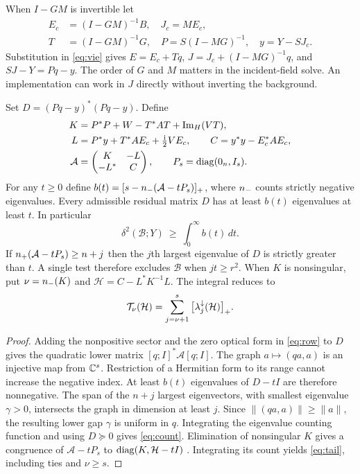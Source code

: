 When $I-GM$ is invertible let
\begin{align}
 E_c&=(I-GM)^{-1}B,\quad J_c=ME_c,\nonumber\\
 T&=(I-GM)^{-1}G,\quad P=S(I-MG)^{-1},\quad y=Y-SJ_c .
 \label{eq:shift}
\end{align}
Substitution in \eqref{eq:vie} gives $E=E_c+Tq$, $J=J_c+(I-MG)^{-1}q$, and $SJ-Y=Pq-y$. The order of $G$ and $M$ matters in the incident-field solve. An implementation can work in $J$ directly without inverting the background.

\begin{theorem}\label{th:main}
Set $D=(Pq-y)^*(Pq-y)$. Define
\begin{align}
 K&=P^*P+W-T^*AT+\operatorname{Im}_{H}(VT),\\
 L&=P^*y+T^*AE_c+\tfrac{{\rm i}}{2}VE_c,\qquad C=y^*y-E_c^*AE_c,\\
 \mathcal A&=\begin{pmatrix}K&-L\\-L^*&C\end{pmatrix},\qquad
 P_s=\operatorname{diag}(0_n,I_s). \label{eq:border}
\end{align}
For any $t\ge0$ define $b(t)=[s-n_{-}(\mathcal A-tP_s)]_+$, where $n_{-}$ counts strictly negative eigenvalues. Every admissible residual matrix $D$ has at least $b(t)$ eigenvalues at least $t$. In particular
\begin{equation}
 \delta^2(\mathcal B;Y)\ \ge\ \int_0^\infty b(t)\,dt.
 \label{eq:count}
\end{equation}
If $n_{+}(\mathcal A-tP_s)\ge n+j$ then the $j$th largest eigenvalue of $D$ is strictly greater than $t$. A single test therefore excludes $\mathcal B$ when $jt\ge r^2$. When $K$ is nonsingular, put $\nu=n_{-}(K)$ and $\mathcal H=C-L^*K^{-1}L$. The integral reduces to
\begin{equation}
 \mathcal T_\nu(\mathcal H)=\sum_{j=\nu+1}^{s}\big[\lambda_j^\downarrow(\mathcal H)\big]_+.
 \label{eq:tail}
\end{equation}
\end{theorem}
\begin{proof}
Adding the nonpositive sector and the zero optical form in \eqref{eq:row} to $D$ gives the quadratic lower matrix $[q;I]^*\mathcal A[q;I]$. The graph $a\mapsto(qa,a)$ is an injective map from $\mathbb C^s$. Restriction of a Hermitian form to its range cannot increase the negative index. At least $b(t)$ eigenvalues of $D-tI$ are therefore nonnegative. The span of the $n+j$ largest eigenvectors, with smallest eigenvalue $\gamma>0$, intersects the graph in dimension at least $j$. Since $\|(qa,a)\|\ge\|a\|$, the resulting lower gap $\gamma$ is uniform in $q$. Integrating the eigenvalue counting function and using $D\succeq0$ gives \eqref{eq:count}. Elimination of nonsingular $K$ gives a congruence of $\mathcal A-tP_s$ to $\operatorname{diag}(K,\mathcal H-tI)$ \cite{haynsworth}. Integrating its count yields \eqref{eq:tail}, including ties and $\nu\ge s$.
\end{proof}

